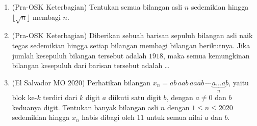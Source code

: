 \documentclass[12pt]{scrartcl}
\begin{document}
\begin{enumerate}
	\item (Pra-OSK Keterbagian)
	Tentukan semua bilangan asli $n$ sedemikian hingga $\lfloor \sqrt{n} \rfloor$ membagi $n$.

	\item (Pra-OSK Keterbagian)
	Diberikan sebuah barisan sepuluh bilangan asli naik tegas sedemikian hingga
	setiap bilangan membagi bilangan berikutnya.
	Jika jumlah kesepuluh bilangan tersebut adalah $1918$,
	maka semua kemungkinan bilangan kesepuluh dari barisan tersebut adalah \dots

	\item (El Salvador MO 2020)
	Perhatikan bilangan $x_n = \overline{ab\,aab\,aaab\,\cdots\,\underbrace{a\ldots a}_{n}b}$,
	yaitu blok ke-$k$ terdiri dari $k$ digit $a$ diikuti satu digit $b$,
	dengan $a \ne 0$ dan $b$ keduanya digit.
	Tentukan banyak bilangan asli $n$ dengan $1 \le n \le 2020$ sedemikian hingga
	$x_n$ habis dibagi oleh $11$ untuk semua nilai $a$ dan $b$.

\end{enumerate}
\end{document}
